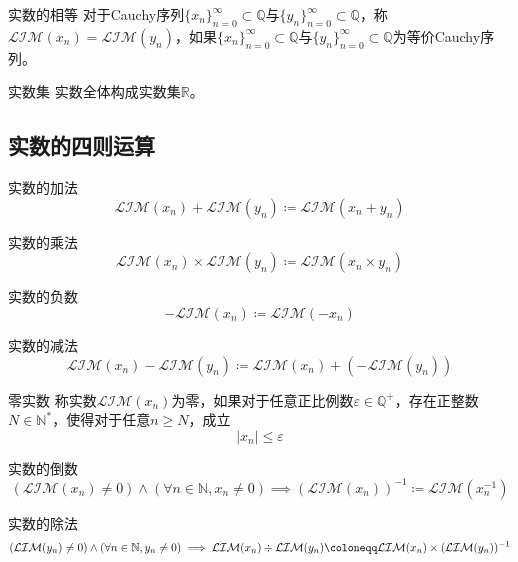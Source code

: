 \documentclass[lang = cn, scheme = chinese, thmcnt = section]{elegantbook}
\newcommand{\N}{\mathbb{N}}            %
\newcommand{\R}{\mathbb{R}}            %
\newcommand{\Q}{\mathbb{Q}}            %
\newcommand{\sub}{\subset}             %
\begin{document}
\begin{definition}{实数的相等}
	对于Cauchy序列$\{x_n\}_{n=0}^{\infty}\sub\Q$与$\{y_n\}_{n=0}^{\infty}\sub\Q$，称$\mathcal{LIM}{(x_n)}=\mathcal{LIM}{(y_n)}$，如果$\{x_n\}_{n=0}^{\infty}\sub\Q$与$\{y_n\}_{n=0}^{\infty}\sub\Q$为等价Cauchy序列。
\end{definition}

\begin{definition}{实数集}
	实数全体构成实数集$\R$。
\end{definition}

\subsection{实数的四则运算}

\begin{definition}{实数的加法}
	$$
	\mathcal{LIM}{(x_n)}+\mathcal{LIM}{(y_n)}\coloneqq
	\mathcal{LIM}{(x_n+y_n)}
	$$
\end{definition}

\begin{definition}{实数的乘法}
	$$
	\mathcal{LIM}{(x_n)}\times\mathcal{LIM}{(y_n)}\coloneqq
	\mathcal{LIM}{(x_n\times y_n)}
	$$
\end{definition}

\begin{definition}{实数的负数}
	$$
	-\mathcal{LIM}{(x_n)}\coloneqq \mathcal{LIM}{(-x_n)}
	$$
\end{definition}

\begin{definition}{实数的减法}
	$$
	\mathcal{LIM}{(x_n)}-\mathcal{LIM}{(y_n)}\coloneqq
	\mathcal{LIM}{(x_n)}+(-\mathcal{LIM}{(y_n)})
	$$
\end{definition}

\begin{definition}{零实数}
	称实数$\mathcal{LIM}{(x_n)}$为零，如果对于任意正比例数$\varepsilon\in\Q^+$，存在正整数$N\in\N^*$，使得对于任意$n\ge N$，成立
	$$
	|x_n| \le \varepsilon
	$$
\end{definition}

\begin{definition}{实数的倒数}
	$$
	(\mathcal{LIM}{(x_n)}\ne0)\wedge(\forall n\in\N,x_n\ne 0)\implies
	(\mathcal{LIM}{(x_n)})^{-1}\coloneqq
	\mathcal{LIM}{(x_n^{-1})}
	$$
\end{definition}

\begin{definition}{实数的除法}
	$$
	(\mathcal{LIM}{(y_n)}\ne0)\wedge(\forall n\in\N,y_n\ne 0)\implies
	\mathcal{LIM}{(x_n)}\divisionsymbol\mathcal{LIM}{(y_n)}
	\coloneqq
	\mathcal{LIM}{(x_n)}\times(\mathcal{LIM}{(y_n)})^{-1}
	$$
\end{definition}
\end{document}
